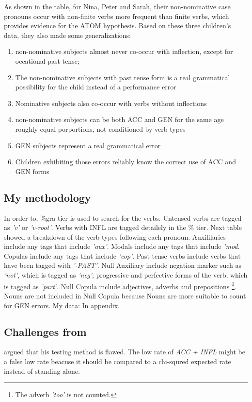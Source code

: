 As shown in the table, for Nina, Peter and Sarah, their non-nominative case pronouns occur with non-finite verbs more frequent than finite verbs, which provides evidence for the ATOM hypothesis. Based on these three children's data, they also made some generalizations:
\begin{enumerate}
   \item non-nominative subjects almost never co-occur with inflection, except for occational past-tense;
\item The non-nominative subjects with past tense form is a real grammatical possibility for the child instead of a performance error
\item Nominative subjects also co-occur with verbs without inflections
\item non-nominative subjects can be both ACC and GEN for the same age roughly equal porportions, not conditioned by verb types
\item GEN subjects represent a real grammatical error 
\item Children exhibiting those errors reliably know the correct use of ACC and GEN forms 
\end{enumerate}



\subsection{My methodology}
In order to, \%gra tier is used to search for the verbs. Untensed verbs are tagged as \textit{'v'} or \textit{'v-root'}. Verbs with INFL are tagged detailely in the \% tier. Next table showed a breakdown of the verb types following each pronoun. 
Auxililaries include any tags that include \textit{'aux'}. Modals include any tags that include \textit{'mod}. Copulas include any tags that include \textit{'cop'}. Past tense verbs include verbs that have been tagged with \textit{'-PAST'}. Null Auxiliary include negation marker such as \textit{'not'}, which is tagged as \textit{'neg'}; progressive and perfective forms of the verb, which is tagged as \textit{'part'}. Null Copula include adjectives, adverbs and prepositions \footnote{The adverb \textit{'too'} is not counted.}. Nouns are not included in Null Copula because Nouns are more suitable to count for GEN errors. 
My data:
In appendix. 
    

\subsection{Challenges from \cite{pine2005testing}}
\cite{pine2005testing} argued that his testing method is flawed. The low rate of \textit{ACC + INFL} might be a false low rate beacuse it should be compared to a chi-squred expected rate instead of standing alone. \\

